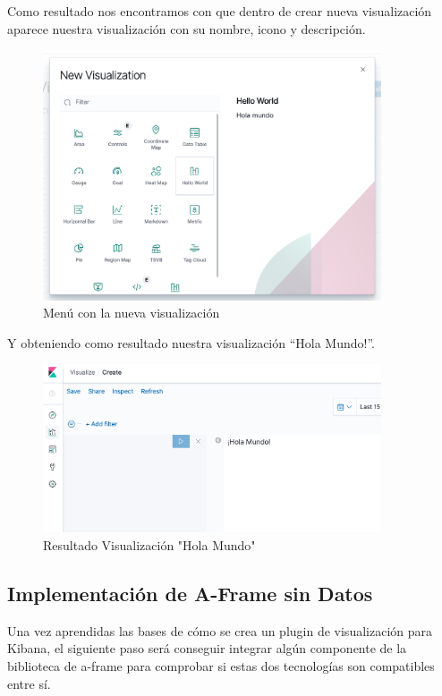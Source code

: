 \documentclass[a4paper, 12pt]{book}
\begin{document}
Como resultado nos encontramos con que dentro de crear nueva visualización aparece nuestra visualización con su nombre, icono y descripción.

\begin{figure}[H]
  \centering
  \includegraphics[width=10cm, keepaspectratio]{img/development/menu-visualizaciones.png}
  \caption{Menú con la nueva visualización}
  \label{fig:menuvisualization}
\end{figure}

Y obteniendo como resultado nuestra visualización “Hola Mundo!”.

\begin{figure}[H]
  \centering
  \includegraphics[width=10cm, keepaspectratio]{img/development/resultado-hola-mundo.png}
  \caption{Resultado Visualización "Hola Mundo"}
  \label{fig:resultadoholamundo}
\end{figure}

\subsection{Implementación de A-Frame sin Datos}

Una vez aprendidas las bases de cómo se crea un plugin de visualización para Kibana, el siguiente paso será conseguir integrar algún componente de la biblioteca de a-frame para comprobar si estas dos tecnologías son compatibles entre sí.
\end{document}
